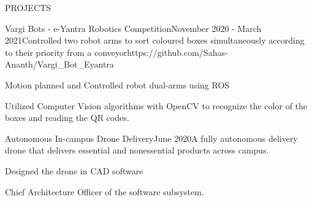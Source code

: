 \documentclass{resume} %
\begin{document}
\begin{rSection}{PROJECTS}
	\begin{rProjExpDetails}{Vargi Bots - e-Yantra Robotics Competition}{}{November 2020 - March 2021}{Controlled two robot arms to sort coloured boxes simultaneously according to their priority from a conveyor}{https://github.com/Sahas-Ananth/Vargi_Bot_Eyantra}{}
		\item Motion planned and Controlled robot dual-arms using ROS
		\item Utilized Computer Vision algorithms with OpenCV to recognize the color of the boxes and reading the QR codes.
	\end{rProjExpDetails}

	\begin{rProjExpDetails}{Autonomous In-campus Drone Delivery}{}{June 2020}{A fully autonomous delivery drone that delivers essential and nonessential products across campus.}{}{}
		\item Designed the drone in CAD software
		\item Chief Architecture Officer of the software subsystem.
	\end{rProjExpDetails}

\end{rSection}
\end{document}
